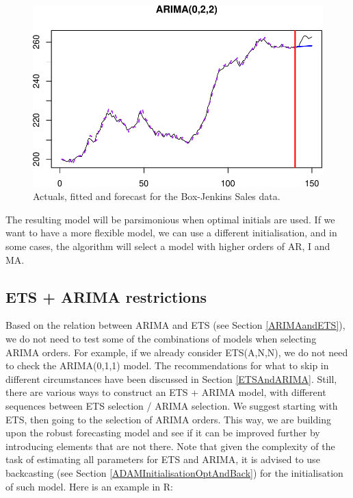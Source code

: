 \documentclass[
]{book}
\theoremstyle{definition}
\theoremstyle{definition}
\theoremstyle{definition}
\theoremstyle{definition}
\theoremstyle{remark}
\begin{document}
\begin{figure}
\centering
\includegraphics{Svetunkov--2022----ADAM_files/figure-latex/adamARIMAModelFitExample-1.pdf}
\caption{\label{fig:adamARIMAModelFitExample}Actuals, fitted and forecast for the Box-Jenkins Sales data.}
\end{figure}

The resulting model will be parsimonious when optimal initials are used. If we want to have a more flexible model, we can use a different initialisation, and in some cases, the algorithm will select a model with higher orders of AR, I and MA.

\hypertarget{ets-arima-restrictions}{%
\subsection{ETS + ARIMA restrictions}\label{ets-arima-restrictions}}

Based on the relation between ARIMA and ETS (see Section \ref{ARIMAandETS}), we do not need to test some of the combinations of models when selecting ARIMA orders. For example, if we already consider ETS(A,N,N), we do not need to check the ARIMA(0,1,1) model. The recommendations for what to skip in different circumstances have been discussed in Section \ref{ETSAndARIMA}. Still, there are various ways to construct an ETS + ARIMA model, with different sequences between ETS selection / ARIMA selection. We suggest starting with ETS, then going to the selection of ARIMA orders. This way, we are building upon the robust forecasting model and see if it can be improved further by introducing elements that are not there. Note that given the complexity of the task of estimating all parameters for ETS and ARIMA, it is advised to use backcasting (see Section \ref{ADAMInitialisationOptAndBack}) for the initialisation of such model. Here is an example in R:
\end{document}
